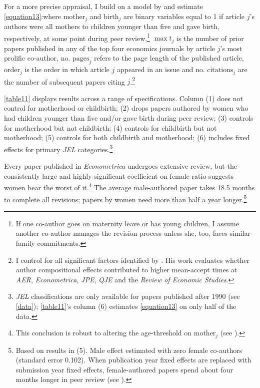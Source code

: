 For a more precise appraisal, I build on a model by  \citet[][Table 6, p. 963]{Ellison2002a} and estimate \autoref{equation13}:where $\text{mother}_j$ and $\text{birth}_j$ are binary variables equal to 1 if article $j$'s authors were all mothers to children younger than five and gave birth, respectively, at some point during peer review,\footnote{If one co-author goes on maternity leave or has young children, I assume another co-author manages the revision process unless she, too, faces similar family commitments.} $\max t_j$ is the number of prior papers published in any of the top four economics journals by article $j$'s most prolific co-author, $\text{no. pages}_j$ refers to the page length of the published article, $\text{order}_j$ is the order in which article $j$ appeared in an issue and $\text{no. citations}_j$ are the number of subsequent papers citing $j$.\footnote{I control for all significant factors identified by  \citet{Ellison2002a}. His work evaluates whether author compositional effects contributed to higher mean-accept times at \emph{AER}, \emph{Econometrica}, \emph{JPE}, \emph{QJE} and the \emph{Review of Economic Studies}.}



\autoref{table11} displays results across a range of specifications. Column (1) does not control for motherhood or childbirth; (2) drops papers authored by women who had children younger than five and\slash or gave birth during peer review; (3) controls for motherhood but not childbirth; (4) controls for childbirth but not motherhood; (5) controls for both childbirth and motherhood; (6) includes fixed effects for primary \emph{JEL} categories.\footnote{\emph{JEL} classifications are only available for papers published after 1990 (see \autoref{data}); \autoref{table11}'s column (6) estimates \autoref{equation13} on only half of the data.}

Every paper published in \emph{Econometrica} undergoes extensive review, but the consistently large and highly significant coefficient on female ratio suggests women bear the worst of it.\footnote{This conclusion is robust to altering the age-threshold on $\text{mother}_j$ (see ).} The average male-authored paper takes 18.5 months to complete all revisions; papers by women need more than half a year longer.\footnote{\label{Footnote88}Based on results in (5). Male effect estimated with zero female co-authors (standard error 0.102). When publication year fixed effects are replaced with submission year fixed effects, female-authored papers spend about four months longer in peer review (see ).}

